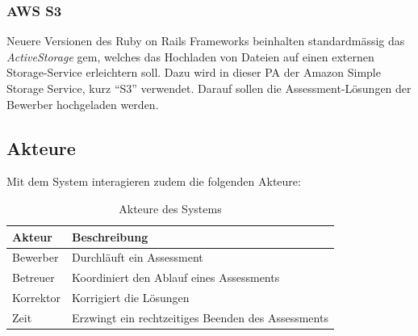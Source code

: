 \subsubsection{AWS S3}
Neuere Versionen des Ruby on Rails Frameworks beinhalten standardmässig das \emph{ActiveStorage} gem, welches das Hochladen von Dateien auf einen
externen Storage-Service erleichtern soll. Dazu wird in dieser PA der Amazon Simple Storage Service, kurz \enquote{S3} verwendet.
Darauf sollen die Assessment-Lösungen der Bewerber hochgeladen werden.

\subsection{Akteure}

Mit dem System interagieren zudem die folgenden Akteure:

\begin{table}[H]
    \renewcommand{\arraystretch}{}
    \begin{tabular}{|l|l|}
        \hline
        \rowcolor{PrimaryColor!30} \textbf{Akteur} & \textbf{Beschreibung}                              \\
        \hline
        Bewerber                                   & Durchläuft ein Assessment                          \\
        \hline
        Betreuer                                   & Koordiniert den Ablauf eines Assessments           \\
        \hline
        Korrektor                                  & Korrigiert die Lösungen                            \\
        \hline
        Zeit                                       & Erzwingt ein rechtzeitiges Beenden des Assessments \\
        \hline
    \end{tabular}
    \caption{\label{tab:participants} Akteure des Systems}
\end{table}

